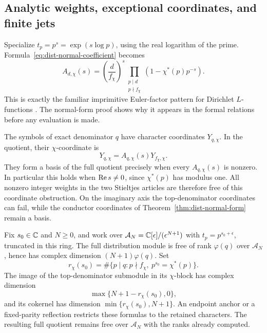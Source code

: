 \subsection{Analytic weights, exceptional coordinates, and finite jets}

Specialize \(t_p=p^s=\exp(s\log p)\), using the real logarithm
of the prime. Formula~\eqref{eq:dist-normal-coefficient} becomes
\begin{equation}
 A_{d,\chi}(s)=
 \left(\frac d{f_\chi}\right)^s
 \prod_{\substack{p\mid d\\p\nmid f_\chi}}
       \left(1-\chi^*(p)p^{-s}\right).
 \label{eq:dist-euler-coefficient}
\end{equation}
This is exactly the familiar imprimitive Euler-factor pattern
for Dirichlet \(L\)-functions \cite{DLMF}. The normal-form proof
shows why it appears in the formal relations before any
evaluation is made.

The symbols of exact denominator \(q\) have character coordinates
\(Y_{q,\chi}\). In the quotient, their \(\chi\)-coordinate is
\begin{equation}
 Y_{q,\chi}=A_{q,\chi}(s)Y_{f_\chi,\chi}.
 \label{eq:dist-top-coordinate}
\end{equation}
They form a basis of the full quotient precisely when every
\(A_{q,\chi}(s)\) is nonzero. In particular this holds when
\(\operatorname{Re} s\ne0\), since \(\chi^*(p)\) has modulus one.
All nonzero integer weights in the two Stieltjes articles are
therefore free of this coordinate obstruction. On the imaginary
axis the top-denominator coordinates can fail, while the
conductor coordinates of Theorem~\ref{thm:dist-normal-form}
remain a basis.

\begin{theorem}
\label{thm:dist-jet-defect}
Fix \(s_0\in\mathbb{C}\) and \(N\geq0\), and work over
\(\mathcal A_N=\mathbb{C}[\epsilon]/(\epsilon^{N+1})\) with
\(t_p=p^{s_0+\epsilon}\), truncated in this ring.
The full distribution module is free of rank \(\varphi(q)\)
over \(\mathcal A_N\), hence has complex dimension
\((N+1)\varphi(q)\).
Set
\begin{equation}
 r_\chi(s_0)=
 \#\{p\mid q:p\nmid f_\chi,\ p^{s_0}=\chi^*(p)\}.
 \label{eq:dist-resonance-count}
\end{equation}
The image of the top-denominator submodule in its \(\chi\)-block
has complex dimension
\begin{equation}
 \max\{N+1-r_\chi(s_0),0\},
 \label{eq:dist-jet-image}
\end{equation}
and its cokernel has dimension
\(\min\{r_\chi(s_0),N+1\}\).
An endpoint anchor or a fixed-parity reflection restricts these
formulas to the retained characters. The resulting full quotient
remains free over \(\mathcal A_N\) with the ranks already computed.
\end{theorem}

